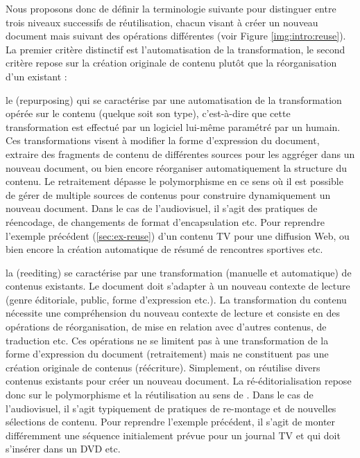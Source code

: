 Nous proposons donc de définir la terminologie suivante pour distinguer entre trois niveaux successifs de réutilisation, chacun visant à créer un nouveau document mais suivant des opérations différentes (voir Figure \ref{img:intro:reuse}). 
La premier critère distinctif est l'automatisation de la transformation, le second critère repose sur la création originale de contenu plutôt que la réorganisation d'un existant : 
\begin{liste}
	\item le  (repurposing) qui se caractérise par une automatisation de la transformation opérée sur le contenu (quelque soit son type), c'est-à-dire que cette transformation est effectué par un logiciel lui-même paramétré par un humain. 
	Ces transformations visent à modifier la forme d'expression du document, extraire des fragments de contenu de différentes sources pour les aggréger dans un nouveau document, ou bien encore réorganiser automatiquement la structure du contenu. 
	Le retraitement dépasse le polymorphisme en ce sens où il est possible de gérer de multiple sources de contenus pour construire dynamiquement un nouveau document. 
	Dans le cas de l'audiovisuel, il s'agit des pratiques de réencodage, de changements de format d'encapsulation etc.
	Pour reprendre l'exemple précédent (\ref{sec:ex-reuse}) d'un contenu TV pour une diffusion Web, ou bien encore la création automatique de résumé de rencontres sportives etc. \\

	\item la  (reediting) se caractérise par une transformation (manuelle et automatique) de contenus existants. 
	Le document doit s'adapter à un nouveau contexte de lecture (genre éditoriale, public, forme d'expression etc.).
	La transformation du contenu nécessite une compréhension du nouveau contexte de lecture et consiste en des opérations de réorganisation, de mise en relation avec d'autres contenus, de traduction etc. 
	Ces opérations ne se limitent pas à une transformation de la forme d'expression du document (retraitement) mais ne constituent pas une création originale de contenus (réécriture). 
	Simplement, on réutilise divers contenus existants pour créer un nouveau document.  
	La ré-éditorialisation repose donc sur le polymorphisme et la réutilisation au sens de \cite{Crozat2011}.
	Dans le cas de l'audiovisuel, il s'agit typiquement de pratiques de re-montage et de nouvelles sélections de contenu. 
	Pour reprendre l'exemple précédent, il s'agit de monter différemment une séquence initialement prévue pour un journal TV et qui doit s'insérer dans un DVD etc. \\


\end{liste}
